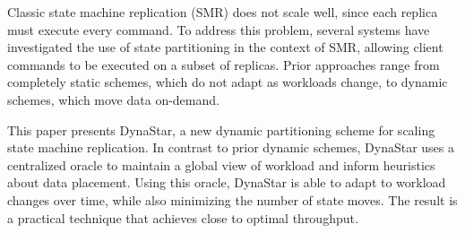 
Classic state machine replication (SMR) does not scale well, since
each replica must execute every command.  To address this problem,
several systems have investigated the use of state partitioning in the
context of SMR, allowing client commands to be executed on a subset of
replicas. Prior approaches range from completely static schemes, which do not
adapt as workloads change, to dynamic schemes, which move data on-demand.


This paper presents DynaStar, a new dynamic partitioning scheme for
scaling state machine replication. In contrast to prior dynamic
schemes, DynaStar uses a centralized oracle to maintain a global view
of workload and inform heuristics about data placement. Using this
oracle, DynaStar is able to adapt to workload changes over time,
while also minimizing the number of state moves. The result is a
practical technique that achieves close to optimal throughput.


